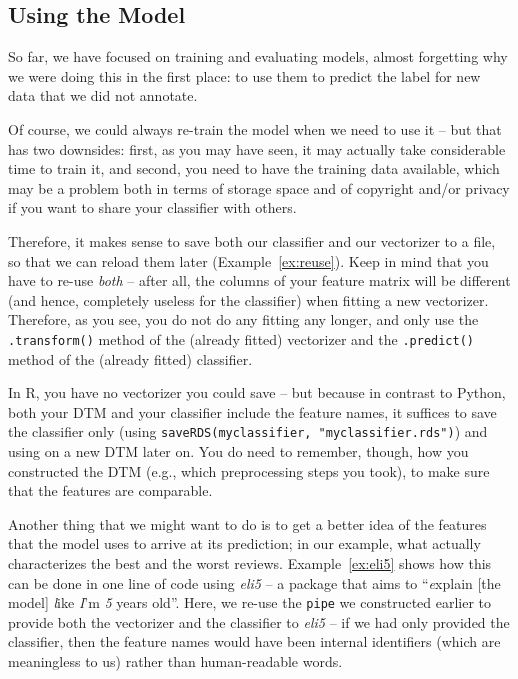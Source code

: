 \subsection{Using the Model}\label{sec:usingmodel}

So far, we have focused on training and evaluating models, almost
forgetting why we were doing this in the first place: to use them to
predict the label for new data that we did not annotate.

Of course, we could always re-train the model when we need to use it
-- but that has two downsides: first, as you may have seen, it may
actually take considerable time to train it, and second, you need to
have the training data available, which may be a problem both in terms
of storage space and of copyright and/or privacy if you want to share
your classifier with others.

Therefore, it makes sense to save both our classifier and our
vectorizer to a file, so that we can reload them later
(Example~\ref{ex:reuse}). Keep in mind that you have to re-use \emph{both}
-- after all, the columns of your feature matrix will be different (and hence, completely useless for the classifier) when
fitting a new vectorizer. Therefore, as you see, you do not do any fitting any longer, and only use the \verb|.transform()| method of the (already fitted) vectorizer and the \verb|.predict()| method of the (already fitted) classifier.

In R, you have no vectorizer you could save -- but because in contrast to Python, both your DTM and your classifier include the feature names, it suffices to save the classifier only (using \verb+saveRDS(myclassifier, "myclassifier.rds")+) and using on a new DTM later on. You do need to remember, though, how you constructed the DTM (e.g., which preprocessing steps you took), to make sure that the features are comparable.




Another thing that we might want to do is to get a better idea of the
features that the model uses to arrive at its prediction; in our
example, what actually characterizes the best and the worst
reviews. Example~\ref{ex:eli5} shows how this can be done in one line of code
using \emph{eli5} -- a package that aims to ``\emph{e}xplain [the model]
\emph{l}ike \emph{I}'m \emph{5} years old''. Here, we re-use the
\verb|pipe| we constructed earlier to provide both the vectorizer and the
classifier to  \emph{eli5} -- if we had only provided the
classifier, then the feature names would have been internal
identifiers (which are meaningless to us) rather than human-readable
words.

